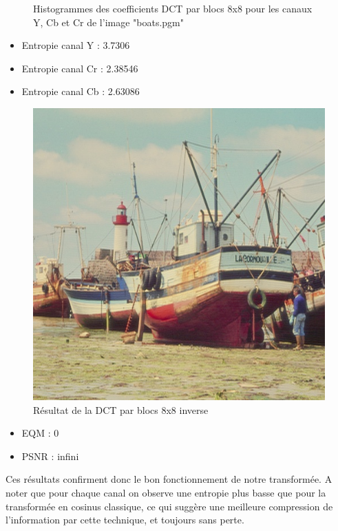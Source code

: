 \documentclass[12pt]{report}
\begin{document}
\begin{figure}[H]
\begin{center}
\caption{Histogrammes des coefficients DCT par blocs 8x8 pour les canaux Y, Cb et Cr de l'image "boats.pgm"}
\end{center}
\end{figure}

\begin{itemize}
\item Entropie canal Y : 3.7306
\item Entropie canal Cr : 2.38546
\item Entropie canal Cb : 2.63086\\
\end{itemize}

\begin{figure}[H]
\begin{center}
\includegraphics[scale=0.5]{../ImageRes/idct_masked2_result.jpg} 
\caption{Résultat de la DCT par blocs 8x8 inverse}
\end{center}
\end{figure}

\begin{itemize}
\item EQM : 0
\item PSNR : infini\\
\end{itemize}

Ces résultats confirment donc le bon fonctionnement de notre transformée. A noter que pour chaque canal on observe une entropie plus basse que pour la transformée en cosinus classique, ce qui suggère une meilleure compression de l'information par cette technique, et toujours sans perte.
\end{document}
